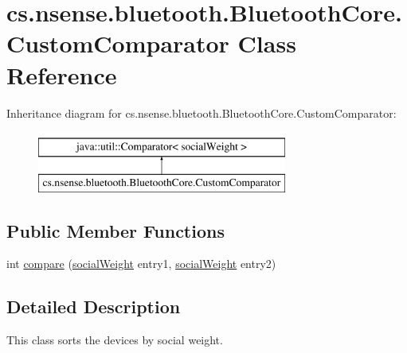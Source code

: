 \hypertarget{classcs_1_1nsense_1_1bluetooth_1_1_bluetooth_core_1_1_custom_comparator}{\section{cs.\-nsense.\-bluetooth.\-Bluetooth\-Core.\-Custom\-Comparator Class Reference}
\label{classcs_1_1nsense_1_1bluetooth_1_1_bluetooth_core_1_1_custom_comparator}
}
Inheritance diagram for cs.\-nsense.\-bluetooth.\-Bluetooth\-Core.\-Custom\-Comparator\-:\begin{figure}[H]
\begin{center}
\leavevmode
\includegraphics[height=2.000000cm]{classcs_1_1nsense_1_1bluetooth_1_1_bluetooth_core_1_1_custom_comparator}
\end{center}
\end{figure}
\subsection*{Public Member Functions}
\begin{DoxyCompactItemize}
\item 
int \hyperlink{classcs_1_1nsense_1_1bluetooth_1_1_bluetooth_core_1_1_custom_comparator_a5dc42c15d7f1572e9ed731e527a28d66}{compare} (\hyperlink{classcs_1_1nsense_1_1bluetooth_1_1_bluetooth_core_1_1social_weight}{social\-Weight} entry1, \hyperlink{classcs_1_1nsense_1_1bluetooth_1_1_bluetooth_core_1_1social_weight}{social\-Weight} entry2)
\end{DoxyCompactItemize}


\subsection{Detailed Description}
This class sorts the devices by social weight. 

